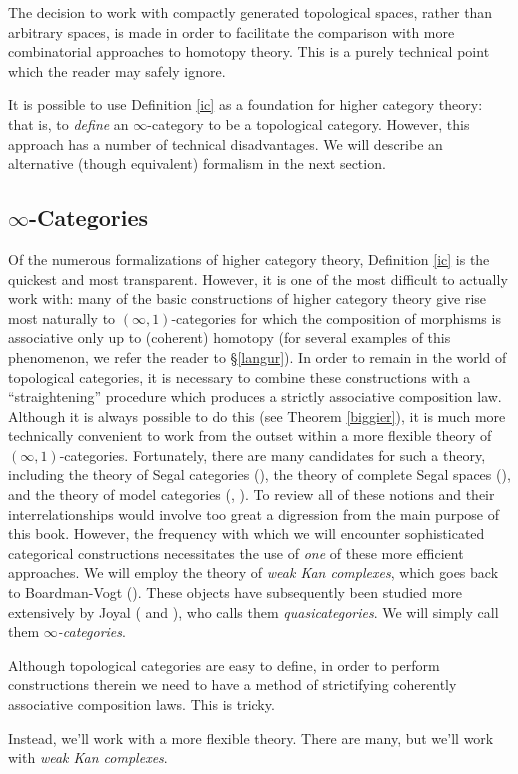 \begin{remark}
The decision to work with compactly generated topological spaces,
rather than arbitrary spaces, is made in order to facilitate the comparison with more
combinatorial approaches to homotopy theory. This is a purely
technical point which the reader may safely ignore.
\end{remark}

It is possible to use Definition \ref{ic} as a foundation for higher category theory: that is, to {\em define} an $\infty$-category to be a topological category. However, this approach has a number of technical disadvantages. We will describe an alternative (though equivalent) formalism in the next section.

\subsection{$\infty$-Categories}\label{qqqc}

Of the numerous formalizations of higher category theory, Definition \ref{ic} is the quickest and most transparent. However, it is one of the most difficult to actually work with: many of the basic constructions of higher category theory give rise most naturally to $(\infty,1)$-categories for which the composition of
morphisms is associative only up to (coherent) homotopy (for several examples of this phenomenon, we refer the reader to \S \ref{langur}). In order to remain in the world of topological categories, it is necessary to combine these constructions with a ``straightening'' procedure which
produces a strictly associative composition law. Although it is always possible to do this
(see Theorem \ref{biggier}), it is much more technically convenient to work from the outset
within a more flexible theory of $(\infty,1)$-categories. Fortunately, there are many candidates
for such a theory, including the theory of Segal categories (\cite{simpson2}), the theory of complete Segal spaces (\cite{completesegal}), and the theory of model categories (\cite{hovey}, \cite{hirschhorn}).
To review all of these notions and their interrelationships would
involve too great a digression from the main purpose of this book.
However, the frequency with which we will encounter sophisticated
categorical constructions necessitates the use of {\em one} of
these more efficient approaches. We will employ the theory of {\it weak Kan complexes}, which goes back to Boardman-Vogt (\cite{quasicat}). These objects have subsequently been studied more extensively by Joyal (\cite{joyalpub} and \cite{joyalnotpub}), who calls them {\it quasicategories}. We will simply call them {\it $\infty$-categories}.
\begin{shaded}
Although topological categories are easy to define, in order to perform constructions therein we need to have a method of strictifying coherently associative composition laws. This is tricky.

Instead, we'll work with a more flexible theory. There are many, but we'll work with \textit{weak Kan complexes}.
\end{shaded}


